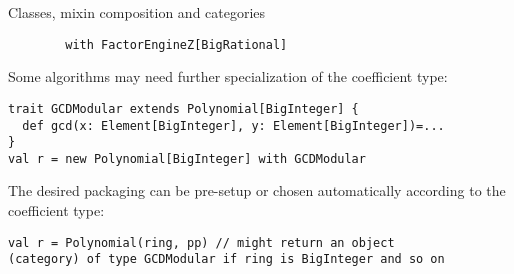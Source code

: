 \documentclass[final]{beamer}
\begin{document}
\begin{frame}[fragile]
\begin{columns}[t]
\begin{column}{.3\linewidth}
\begin{block}{\large Classes, mixin composition and categories}
\begin{lstlisting}
        with FactorEngineZ[BigRational]
\end{lstlisting}
{\footnotesize Some algorithms may need further specialization
of the coefficient type:}\par
\begin{lstlisting}
trait GCDModular extends Polynomial[BigInteger] {
  def gcd(x: Element[BigInteger], y: Element[BigInteger])=...
}
val r = new Polynomial[BigInteger] with GCDModular
\end{lstlisting}
{\footnotesize The desired packaging can be pre-setup or chosen
automatically according to the coefficient type:}\par
\begin{lstlisting}
val r = Polynomial(ring, pp) // might return an object
(category) of type GCDModular if ring is BigInteger and so on
\end{lstlisting}
  \end{block}
  \hfill
\end{column}

\end{columns}

\end{frame}

%
%
%
%
%
\end{document}
